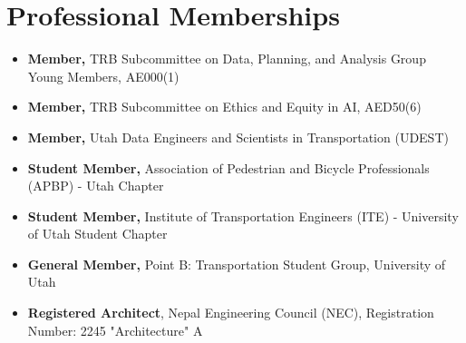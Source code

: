 \section{ \textbf{ Professional Memberships}}
    \begin{itemize}[leftmargin=0.15in]
    	  \item{\textbf{Member, }{TRB Subcommittee on Data, Planning, and Analysis Group Young Members, AE000(1)}} \\
            \item{\textbf{Member, }{TRB Subcommittee on Ethics and Equity in AI, AED50(6)}} \\
            \item{\textbf{Member, }{Utah Data Engineers and Scientists in Transportation (UDEST)}}  \\
            \item{\textbf{Student Member, }{Association of Pedestrian and Bicycle Professionals (APBP) - Utah Chapter}}  \\
            \item{\textbf{Student Member, }{Institute of Transportation Engineers (ITE) - University of Utah Student Chapter}}  \\
            \item{\textbf{General Member, }{Point B: Transportation Student Group, University of Utah}} \\
            \item{\textbf{Registered Architect}{, Nepal Engineering Council (NEC), Registration Number: 2245 "Architecture" A}} \\
    \end{itemize}